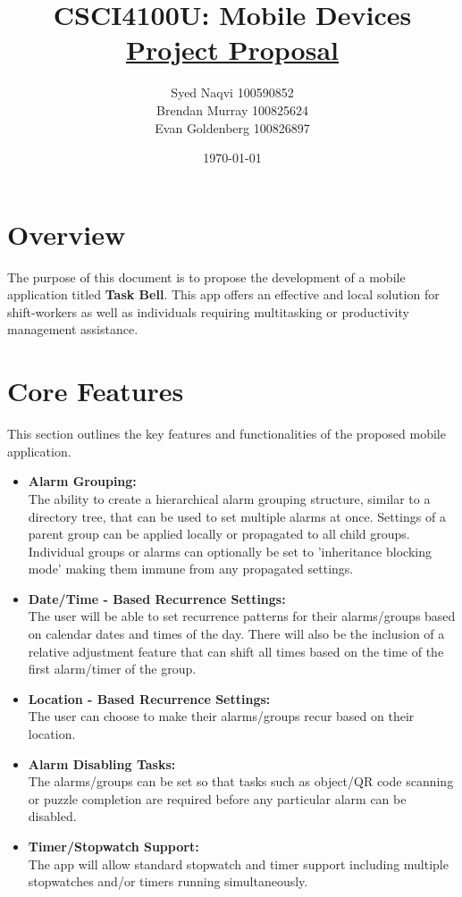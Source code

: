 \documentclass{article}
\title{\vspace*{100pt}CSCI4100U: Mobile Devices \\ \underline{Project Proposal} \vspace*{30pt}}
\author{
    Syed Naqvi 100590852\\ 
    Brendan Murray 100825624\\ 
    Evan Goldenberg 100826897
    \vspace*{30pt}
}
\date{\today}
\begin{document}
\maketitle
\newpage

\tableofcontents
\newpage

\section{Overview}
The purpose of this document is to propose the development of a mobile application titled \textbf{Task Bell}.
This app offers an effective and local solution for shift-workers as well as individuals requiring multitasking
or productivity management assistance.

\section{Core Features}
This section outlines the key features and functionalities of the proposed mobile application.
\begin{itemize}
    
    \item \textbf{Alarm Grouping:}\\The ability to create a hierarchical alarm grouping structure, similar to a directory tree,
    that can be used to set multiple alarms at once. Settings of a parent group can be applied locally or propagated to all child groups.
    Individual groups or alarms can optionally be set to 'inheritance blocking mode' making them immune from any propagated settings.

    \item \textbf{Date/Time - Based Recurrence Settings:}\\The user will be able to set recurrence patterns for their alarms/groups based on
    calendar dates and times of the day. There will also be the inclusion of a relative adjustment feature that can shift all times based on
    the time of the first alarm/timer of the group.

    \item \textbf{Location - Based Recurrence Settings:}\\The user can choose to make their alarms/groups recur based on their location.
    
    \item \textbf{Alarm Disabling Tasks:}\\The alarms/groups can be set so that tasks such as object/QR code scanning or puzzle completion
    are required before any particular alarm can be disabled.

    \item \textbf{Timer/Stopwatch Support:}\\The app will allow standard stopwatch and timer support including multiple stopwatches and/or
    timers running simultaneously.

\end{itemize}
\end{document}
